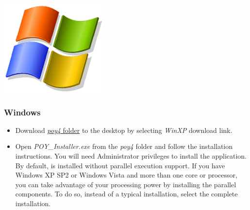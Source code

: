 \begin{flushleft}
	\begin{minipage}[c]{0.074\textwidth}
	   	\includegraphics[width=\textwidth]{doc/figures/figlogowindows.jpg}
	\end{minipage}
	\quad
	\begin{minipage}[t]{0.88\textwidth}
		   	\subsubsection{Windows}
	\end{minipage}
		\begin{itemize}
			\item
                Download
                \href{http://research.amnh.org/scicomp/projects/poy.php}{\emph{poy4} folder} to the desktop by selecting \emph{WinXP} download link.

			\item 
                Open \emph{POY\_Installer.exe} from the \emph{poy4} folder and follow the installation instructions. You will need Administrator privileges to install the application. 
                By default, \poy is installed without parallel execution support. If you have Windows XP SP2 or Windows Vista and more than one core or processor, you can take advantage of your processing power by installing the parallel components. To do so, instead of a typical installation, select the complete installation. 
                

\end{itemize}
\end{flushleft}
